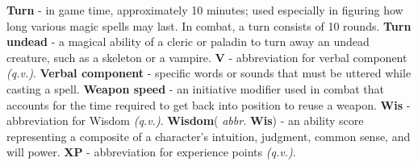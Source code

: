 \documentclass[../main.tex]{subfiles}
\begin{document}
\begin{multicols}{3}
\textbf{Turn} - in game time, approximately 10 minutes; used especially in figuring how long various magic spells may last. In combat, a turn consists of 10 rounds.
\textbf{Turn undead} - a magical ability of a cleric or paladin to turn away an undead creature, such as a skeleton or a vampire.
\textbf{V} - abbreviation for verbal component \textit{(q.v.)}.
\textbf{Verbal component} - specific words or sounds that must be uttered while casting a spell.
\textbf{Weapon speed} - an initiative modifier used in combat that accounts for the time required to get back into position to reuse a weapon.
\textbf{Wis} - abbreviation for Wisdom \textit{(q.v.)}.
\textbf{Wisdom}( \textit{abbr.} \textbf{Wis}) - an ability score representing a composite of a character's intuition, judgment, common sense, and will power.
\textbf{XP} - abbreviation for experience points \textit{(q.v.)}.
	\end{multicols}
\end{document}
